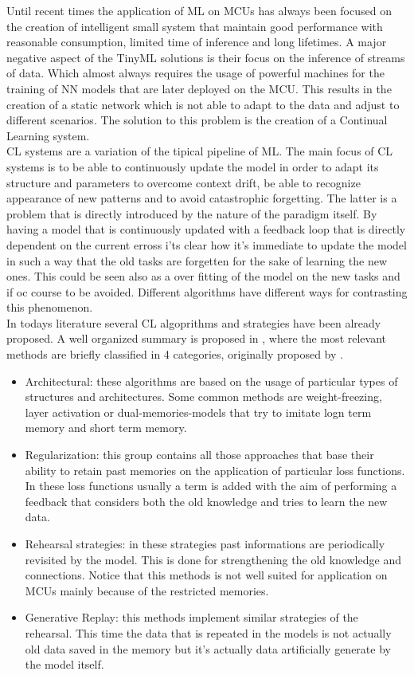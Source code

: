 \documentclass[12pt]{report}
\begin{document}
Until recent times the application of ML on MCUs has always been focused on the creation of intelligent small system that maintain good performance with reasonable consumption, limited time of inference and long lifetimes. A major negative aspect of the TinyML solutions is their focus on the inference of streams of data. Which almost always requires the usage of powerful machines for the training of NN models that are later deployed on the MCU. This results in the creation of a static network which is not able to adapt to the data and adjust to different scenarios. The solution to this problem is the creation of a Continual Learning system. \\
CL systems are a variation of the tipical pipeline of ML. The main focus of CL systems is to be able to continuously update the model in order to adapt its structure and parameters to overcome context drift, be able to recognize appearance of new patterns and to avoid catastrophic forgetting. The latter is a problem that is directly introduced by the nature of the paradigm itself. By having a model that is continuously updated with a feedback loop that is directly dependent on the current erross i'ts clear how it's immediate to update the model in such a way that the old tasks are forgetten for the sake of learning the new ones. This could be seen also as a over fitting of the model on the new tasks and if oc course to be avoided. Different algorithms have different ways for contrasting this phenomenon. \\
In todays literature several CL algoprithms and strategies have been already proposed. A well organized summary is proposed in \cite{lesort2020continual}, where the most relevant methods are briefly classified in 4 categories, originally proposed by \cite{maltoni2019continuous}.
\begin{itemize}
\item Architectural: these algorithms are based on the usage of particular types of structures and architectures. Some common methods are weight-freezing, layer activation or dual-memories-models that try to imitate logn term memory and short term memory.
\item Regularization: this group contains all those approaches that base their ability to retain past memories on the application of particular loss functions. In these loss functions usually a term is added with the aim of performing a feedback that considers both the old knowledge and tries to learn the new data.
\item Rehearsal strategies: in these strategies past informations are periodically revisited by the model. This is done for strengthening the old knowledge and connections. Notice that this methods is not well suited for application on MCUs mainly because of the restricted memories. 
\item Generative Replay: this methods implement similar strategies of the rehearsal. This time the data that is repeated in the models is not actually old data saved in the memory but it's actually data artificially generate by the model itself. 
\end{itemize} 
\end{document}
